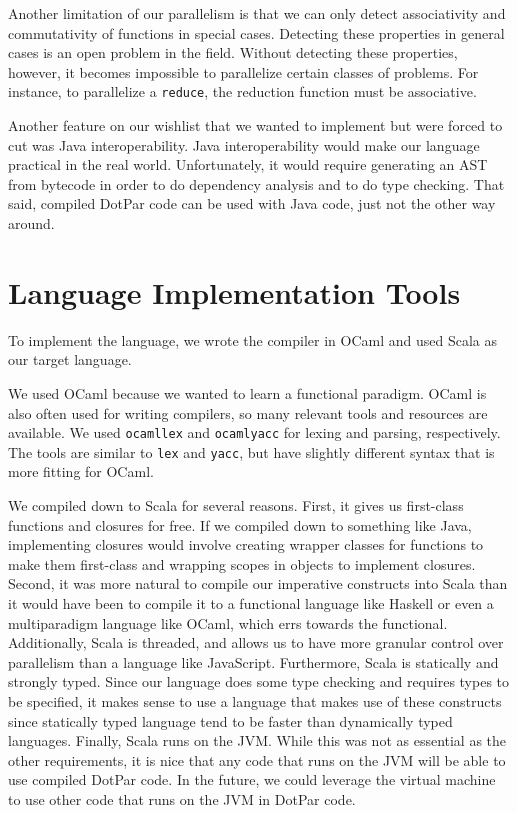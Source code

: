 Another limitation of our parallelism is that we can only detect associativity
and commutativity of functions in special cases. Detecting these properties in
general cases is an open problem in the field. Without detecting these
properties, however, it becomes impossible to parallelize certain classes of
problems. For instance, to parallelize a \verb$reduce$, the reduction function
must be associative.

Another feature on our wishlist that we wanted to implement but were forced to cut was Java
interoperability. Java interoperability would make our language practical in the
real world. Unfortunately, it would require generating an AST from bytecode in
order to do dependency analysis and to do type checking. That said, compiled
DotPar code can be used with Java code, just not the other way around.

\section{Language Implementation Tools}
To implement the language, we wrote the compiler in OCaml and used Scala as our
target language.

We used OCaml because we wanted to learn a functional paradigm. OCaml is also
often used for writing compilers, so many relevant tools and resources are
available. We used \verb$ocamllex$ and \verb$ocamlyacc$ for lexing and parsing,
respectively. The tools are similar to \verb$lex$ and \verb$yacc$, but have
slightly different syntax that is more fitting for OCaml.

We compiled down to Scala for several reasons. First, it gives us first-class
functions and closures for free. If we compiled down to something like Java,
implementing closures would involve creating wrapper classes for functions to
make them first-class and wrapping scopes in objects to implement closures.
Second, it was more natural to compile our imperative constructs into Scala than
it would have been to compile it to a functional language like Haskell or even a
multiparadigm language like OCaml, which errs towards the functional.
Additionally, Scala is threaded, and allows us to have more granular control
over parallelism than a language like JavaScript. Furthermore, Scala is
statically and strongly typed. Since our language does some type checking and
requires types to be specified, it makes sense to use a language that makes use
of these constructs since statically typed language tend to be faster than
dynamically typed languages. Finally, Scala runs on the JVM\@. While this was not
as essential as the other requirements, it is nice that any code that runs on
the JVM will be able to use compiled DotPar code. In the future, we could
leverage the virtual machine to use other code that runs on the JVM in DotPar
code.

